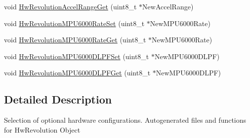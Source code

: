 \begin{DoxyCompactItemize}
\item 
void \hyperlink{group___hw_revolution_ga1afd7eb1d34b4259d83eb4d56250126a}{\-Hw\-Revolution\-Accel\-Range\-Get} (uint8\-\_\-t $\ast$\-New\-Accel\-Range)
\item 
void \hyperlink{group___hw_revolution_gac84e07ecd14552da105d79502f54d64b}{\-Hw\-Revolution\-M\-P\-U6000\-Rate\-Set} (uint8\-\_\-t $\ast$\-New\-M\-P\-U6000\-Rate)
\item 
void \hyperlink{group___hw_revolution_gac36c4c267de52815e33e98f313587f6f}{\-Hw\-Revolution\-M\-P\-U6000\-Rate\-Get} (uint8\-\_\-t $\ast$\-New\-M\-P\-U6000\-Rate)
\item 
void \hyperlink{group___hw_revolution_gaf894659ad175112ba2cc946994289d58}{\-Hw\-Revolution\-M\-P\-U6000\-D\-L\-P\-F\-Set} (uint8\-\_\-t $\ast$\-New\-M\-P\-U6000\-D\-L\-P\-F)
\item 
void \hyperlink{group___hw_revolution_ga7b06259146b242fa61e50f5ce7b1f6a6}{\-Hw\-Revolution\-M\-P\-U6000\-D\-L\-P\-F\-Get} (uint8\-\_\-t $\ast$\-New\-M\-P\-U6000\-D\-L\-P\-F)
\end{DoxyCompactItemize}


\subsection{\-Detailed \-Description}
\-Selection of optional hardware configurations. \-Autogenerated files and functions for \-Hw\-Revolution \-Object 

